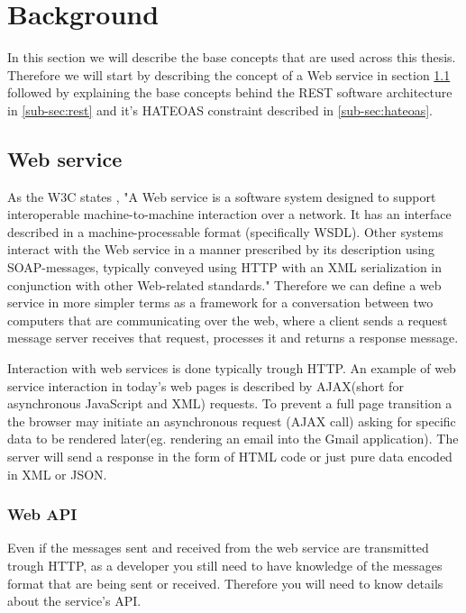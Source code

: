 \section{Background}
\label{sec:background}

In this section we will describe the base concepts that are used across this thesis. Therefore we will start by describing the concept of a Web service in section \ref{sub-sec:web-service} followed by explaining the base concepts behind the REST software architecture in \ref{sub-sec:rest} and it's HATEOAS constraint described in \ref{sub-sec:hateoas}.

\subsection{Web service}
\label{sub-sec:web-service}

As the W3C states \cite{W3C}, "A Web service is a software system designed to support interoperable machine-to-machine interaction over a network. It has an interface described in a machine-processable format (specifically WSDL). Other systems interact with the Web service in a manner prescribed by its description using SOAP-messages, typically conveyed using HTTP with an XML serialization in conjunction with other Web-related standards." Therefore we can define a web service in more simpler terms as a framework for a conversation between two computers that are communicating over the web, where a client sends a request message server receives that request, processes it and returns a response message.

Interaction with web services is done typically trough HTTP. An example of web service interaction in today's web pages is described by AJAX(short for  asynchronous JavaScript and XML) requests. 	To prevent a full page transition a the browser may initiate an asynchronous request (AJAX call) asking for specific data to be rendered later(eg. rendering an email into the Gmail application). The server will send a response in the form of HTML code or just pure data encoded in XML or JSON.

\subsubsection{Web API}
\label{sub-sub-sec:web-api}

Even if the messages sent and received from the web service are transmitted trough HTTP, as a developer you still need to have knowledge of the messages format that are being sent or received. Therefore you will need to know details about the service's API.

